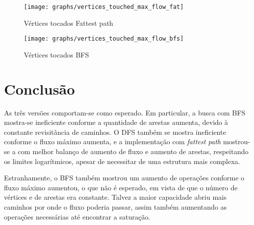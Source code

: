\documentclass[11pt]{article}
\begin{document}
\begin{figure}[h]
	\centering
	\caption{Vértices tocados Fattest path}
	\label{fig:vertices_touched_max_flow_fat}
	\texttt{[image: graphs/vertices\_touched\_max\_flow\_fat]}
\end{figure}

\begin{figure}[H]
	\centering
	\caption{Vértices tocados BFS}
	\label{fig:vertices_touched_max_flow_bfs}
	\texttt{[image: graphs/vertices\_touched\_max\_flow\_bfs]}
\end{figure}

\section{Conclusão}

As três versões comportam-se como esperado. Em particular, a busca com BFS mostra-se ineficiente conforme a quantidade de arestas aumenta, devido à constante revisitância de caminhos. O DFS também se mostra ineficiente conforme o fluxo máximo aumenta, e a implementação com \textit{fattest path} mostrou-se a com melhor balanço de aumento de fluxo e aumento de arestas, respeitando os limites logarítmicos, apesar de necessitar de uma estrutura mais complexa.

Estranhamente, o BFS também mostrou um aumento de operações conforme o fluxo máximo aumentou, o que não é esperado, em vista de que o número de vértices e de arestas era constante. Talvez a maior capacidade abriu mais caminhos por onde o fluxo poderia passar, assim também aumentando as operações necessárias até encontrar a saturação.
\end{document}
